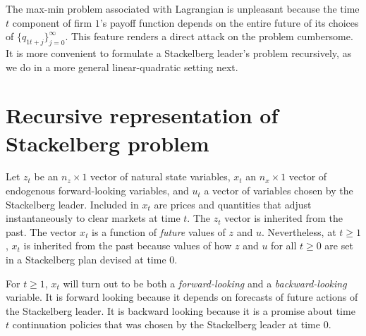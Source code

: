 The max-min problem  associated with Lagrangian   is unpleasant because the time $t$ component of  firm $1$'s payoff function
depends on the entire future of its choices of $\{q_{1t+j}\}_{j=0}^\infty$.
This feature renders a direct attack on the problem cumbersome.
It is more convenient to formulate a Stackelberg leader's problem recursively, as we do in a more general linear-quadratic setting next.




\section{Recursive representation of Stackelberg problem}

Let $z_t$ be  an $n_z \times 1$  vector of natural state variables,
$x_t$ an $n_x \times 1$  vector of  endogenous forward-looking variables, and $u_t$ a vector of  variables chosen by the Stackelberg leader.
Included in $x_t$ are prices and quantities that adjust
instantaneously to clear markets at time $t$.
The $z_t$ vector is inherited from the past.
The vector $x_t$ is a function of  {\it future} values of $z$ and $u$.
Nevertheless,   at $t \geq 1$, $x_t$ is  inherited from the past  because
values of how $z$ and $u$ for all $ t \geq 0$ are set  in a Stackelberg plan devised at time $0$.

  For $t \geq 1$, $x_t$ will turn out to be both a {\it forward-looking\/} and
a {\it backward-looking\/} variable.  It is forward looking because it depends on forecasts of future actions of the Stackelberg leader.
It is backward looking because it is a promise about time $t$ continuation policies  that was  chosen  by the Stackelberg leader at time $0$.

\newpage

